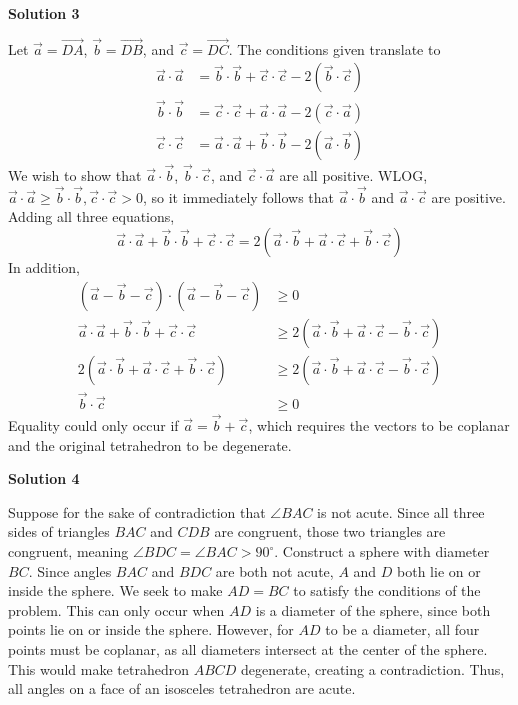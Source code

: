 \begin{enumerate}
 



\textbf{Solution 3}

Let $\vec{a} = \overrightarrow{DA}$, $\vec{b} = \overrightarrow{DB}$, and $\vec{c} = \overrightarrow{DC}$. The conditions given translate to
 \begin{align*} \vec{a}\cdot\vec{a} &= \vec{b}\cdot\vec{b} + \vec{c}\cdot\vec{c} - 2(\vec{b}\cdot\vec{c}) \\ \vec{b}\cdot\vec{b} &= \vec{c}\cdot\vec{c} + \vec{a}\cdot\vec{a} - 2(\vec{c}\cdot\vec{a}) \\ \vec{c}\cdot\vec{c} &= \vec{a}\cdot\vec{a} + \vec{b}\cdot\vec{b} - 2(\vec{a}\cdot\vec{b}) \end{align*}
We wish to show that $\vec{a}\cdot\vec{b}$, $\vec{b}\cdot\vec{c}$, and $\vec{c}\cdot\vec{a}$ are all positive. WLOG, $\vec{a}\cdot\vec{a}\geq \vec{b}\cdot\vec{b}, \vec{c}\cdot\vec{c} > 0$, so it immediately follows that $\vec{a}\cdot\vec{b}$ and $\vec{a}\cdot\vec{c}$ are positive. Adding all three equations,
 \[\vec{a}\cdot\vec{a} + \vec{b}\cdot\vec{b} + \vec{c}\cdot\vec{c} = 2(\vec{a}\cdot\vec{b} + \vec{a}\cdot\vec{c} + \vec{b}\cdot\vec{c})\]In addition,
 \begin{align*} (\vec{a} - \vec{b} - \vec{c})\cdot(\vec{a} - \vec{b} - \vec{c})&\geq 0 \\ \vec{a}\cdot\vec{a} + \vec{b}\cdot\vec{b} + \vec{c}\cdot\vec{c}&\geq 2(\vec{a}\cdot\vec{b} + \vec{a}\cdot\vec{c} - \vec{b}\cdot\vec{c}) \\ 2(\vec{a}\cdot\vec{b} + \vec{a}\cdot\vec{c} + \vec{b}\cdot\vec{c})&\geq 2(\vec{a}\cdot\vec{b} + \vec{a}\cdot\vec{c} - \vec{b}\cdot\vec{c}) \\ \vec{b}\cdot\vec{c}&\geq 0 \end{align*}
Equality could only occur if $\vec{a} = \vec{b} + \vec{c}$, which requires the vectors to be coplanar and the original tetrahedron to be degenerate.

 



\textbf{Solution 4}

Suppose for the sake of contradiction that $\angle BAC$ is not acute. Since all three sides of triangles $BAC$ and $CDB$ are congruent, those two triangles are congruent, meaning $\angle BDC=\angle BAC>90^{\circ}$. Construct a sphere with diameter $BC$. Since angles $BAC$ and $BDC$ are both not acute, $A$ and $D$ both lie on or inside the sphere. We seek to make $AD=BC$ to satisfy the conditions of the problem. This can only occur when $AD$ is a diameter of the sphere, since both points lie on or inside the sphere. However, for $AD$ to be a diameter, all four points must be coplanar, as all diameters intersect at the center of the sphere. This would make tetrahedron $ABCD$ degenerate, creating a contradiction. Thus, all angles on a face of an isosceles tetrahedron are acute.


\end{enumerate}
